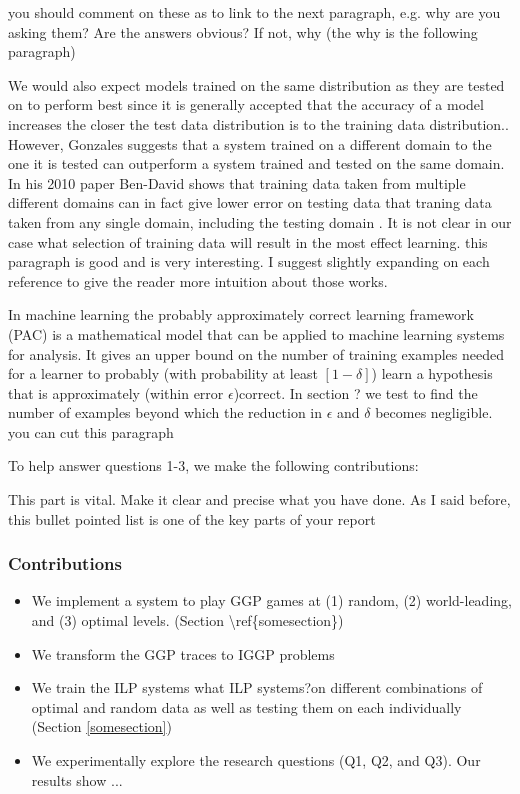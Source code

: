 \ac{you should comment on these as to link to the next paragraph, e.g. why are you asking them? Are the answers obvious? If not, why (the why is the following paragraph)}

We would also expect models trained on the same distribution as they are tested on to perform best since it is generally accepted that the accuracy of a model increases the closer the test data distribution is to the training data distribution.\cite{Mitchell/MachineLearing}. However, Gonzales \cite{Gonzalez/MismatchedOutperform} suggests that a system trained on a different domain to the one it is tested can outperform a system trained and tested on the same domain. In his 2010 paper Ben-David shows that training data taken from multiple different domains can in fact give lower error on testing data that traning data taken from any single domain, including the testing domain \cite{Ben-David/DifferentDomains}. It is not clear in our case what selection of training data will result in the most effect learning.
\ac{this paragraph is good and is very interesting. I suggest slightly expanding on each reference to give the reader more intuition about those works}.

In machine learning the probably approximately correct learning framework (PAC) is a mathematical model that can be applied to machine learning systems for analysis. It gives an upper bound on the number of training examples needed for a learner to probably (with probability at least $[1-\delta]$) learn a hypothesis that is approximately (within error $\epsilon$)correct\cite{Mitchell/MachineLearing}. In section ? we test to find the number of examples beyond which the reduction in $\epsilon$ and $\delta$ becomes negligible.
\ac{you can cut this paragraph}

\ac{To help answer questions 1-3, we make the following contributions:}

\ac{This part is vital. Make it clear and precise what you have done. As I said before, this bullet pointed list is one of the key parts of your report}
\subsubsection{Contributions}
\begin{itemize}
\item \ac{We implement a system to play GGP games at (1) random, (2) world-leading, and (3) optimal levels. (Section \ref{somesection})}
\item We transform the GGP traces to IGGP problems
\item We train the ILP systems \ac{what ILP systems}?on different combinations of optimal and random data as well as testing them on each individually (Section \ref{somesection})

\item We experimentally explore the research questions (Q1, Q2, and Q3). Our results show ...
\end{itemize}